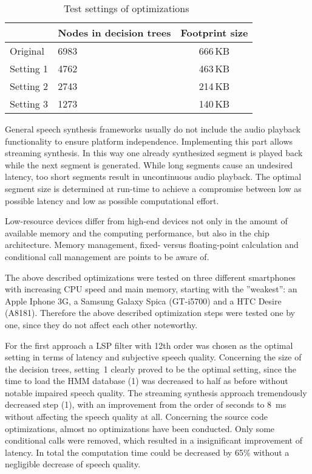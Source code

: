 \begin{table}[h]
	\caption{Test settings of optimizations~\cite{toth:optimizing}}
	\vspace{-0.75em}
	\label{tab:settings}
	\begin{tabularx}{1\columnwidth}{lYc}
		\toprule
		\textbf{} & \textbf{Nodes in decision trees} & \textbf{Footprint size}\\
		\midrule
		Original & 6983 & 666\,KB\\[0.5em]
		Setting 1 & 4762 & 463\,KB\\[0.5em]
		Setting 2 & 2743 & 214\,KB\\[0.5em]
		Setting 3 & 1273 & 140\,KB\\
		\bottomrule
	\end{tabularx}
\end{table}

General speech synthesis frameworks usually do not include the audio playback functionality to ensure platform independence. Implementing this part allows streaming synthesis. In this way one already synthesized segment is played back while the next segment is generated. While long segments cause an undesired latency, too short segments result in uncontinuous audio playback. The optimal segment size is determined at run-time to achieve a compromise between low as possible latency and low as possible computational effort.

Low-resource devices differ from high-end devices not only in the amount of available memory and the computing performance, but also in the chip architecture. Memory management, fixed- versus floating-point calculation and conditional call management are points to be aware of.

The above described optimizations were tested on three different smartphones with increasing CPU speed and main memory, starting with the ''weakest'': an Apple Iphone 3G, a Samsung Galaxy Spica (GT-i5700) and a HTC Desire (A8181). Therefore the above described optimization steps were tested one by one, since they do not affect each other noteworthy.

For the first approach a \ac{LSP} filter with 12th order was chosen as the optimal setting in terms of latency and subjective speech quality. Concerning the size of the decision trees, setting~1 clearly proved to be the optimal setting, since the time to load the \ac{HMM} database (1) was decreased to half as before without notable impaired speech quality. The streaming synthesis approach tremendously decreased step (1), with an improvement from the order of seconds to 8~ms without affecting the speech quality at all. Concerning the source code optimizations, almost no optimizations have been conducted. Only some conditional calls were removed, which resulted in a insignificant improvement of latency. In total the computation time could be decreased by 65\% without a negligible decrease of speech quality.


